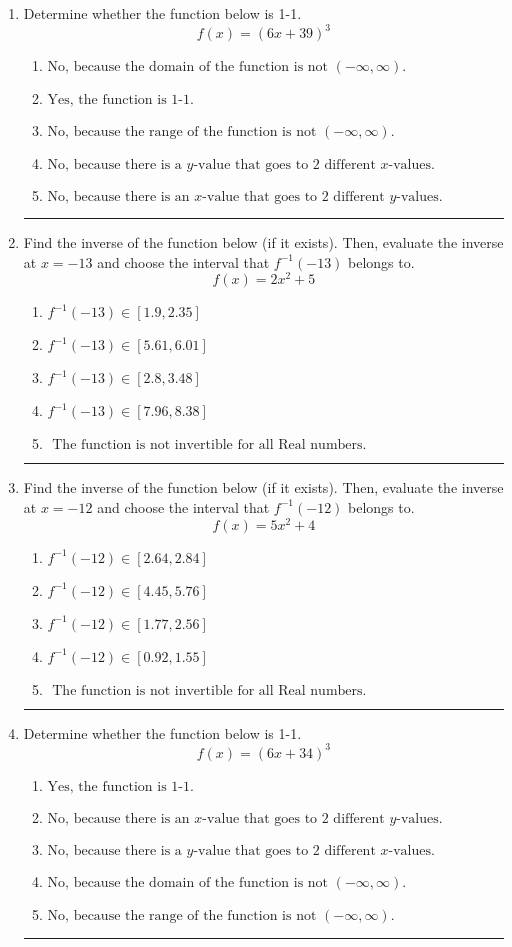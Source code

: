 \documentclass[14pt]{extbook}
\newcommand{\litem}[1]{\item#1\hspace*{-1cm}\rule{\textwidth}{0.4pt}}
\begin{document}
\begin{enumerate}
{\begin{enumerate}[label=\Alph*.]
\end{enumerate} }
\litem{
Determine whether the function below is 1-1.\[ f(x) = (6 x + 39)^3 \]\begin{enumerate}[label=\Alph*.]
\item \( \text{No, because the domain of the function is not $(-\infty, \infty)$.} \)
\item \( \text{Yes, the function is 1-1.} \)
\item \( \text{No, because the range of the function is not $(-\infty, \infty)$.} \)
\item \( \text{No, because there is a $y$-value that goes to 2 different $x$-values.} \)
\item \( \text{No, because there is an $x$-value that goes to 2 different $y$-values.} \)

\end{enumerate} }
\litem{
Find the inverse of the function below (if it exists). Then, evaluate the inverse at $x = -13$ and choose the interval that $f^{-1}(-13)$ belongs to.\[ f(x) = 2 x^2 + 5 \]\begin{enumerate}[label=\Alph*.]
\item \( f^{-1}(-13) \in [1.9, 2.35] \)
\item \( f^{-1}(-13) \in [5.61, 6.01] \)
\item \( f^{-1}(-13) \in [2.8, 3.48] \)
\item \( f^{-1}(-13) \in [7.96, 8.38] \)
\item \( \text{ The function is not invertible for all Real numbers. } \)

\end{enumerate} }
\litem{
Find the inverse of the function below (if it exists). Then, evaluate the inverse at $x = -12$ and choose the interval that $f^{-1}(-12)$ belongs to.\[ f(x) = 5 x^2 + 4 \]\begin{enumerate}[label=\Alph*.]
\item \( f^{-1}(-12) \in [2.64, 2.84] \)
\item \( f^{-1}(-12) \in [4.45, 5.76] \)
\item \( f^{-1}(-12) \in [1.77, 2.56] \)
\item \( f^{-1}(-12) \in [0.92, 1.55] \)
\item \( \text{ The function is not invertible for all Real numbers. } \)

\end{enumerate} }
\litem{
Determine whether the function below is 1-1.\[ f(x) = (6 x + 34)^3 \]\begin{enumerate}[label=\Alph*.]
\item \( \text{Yes, the function is 1-1.} \)
\item \( \text{No, because there is an $x$-value that goes to 2 different $y$-values.} \)
\item \( \text{No, because there is a $y$-value that goes to 2 different $x$-values.} \)
\item \( \text{No, because the domain of the function is not $(-\infty, \infty)$.} \)
\item \( \text{No, because the range of the function is not $(-\infty, \infty)$.} \)


\end{enumerate}}
\end{enumerate}
\end{document}
